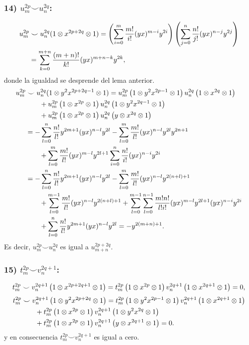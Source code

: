 \documentclass[fleqn,../tesis.tex]{subfiles}
\begin{document}
\subsubsection{14) $u_m^{2p} \smile u_n^{2q}$:}
\begin{align*}
	u_m^{2p} &\smile u_n^{2q}(1 \otimes x^{2p + 2q} \otimes 1) = \left(\sum_{i = 0}^{m}\frac{m!}{i!}(yx)^{m - i}y^{2i}\right)
			\left(\sum_{j = 0}^{n}\frac{n!}{j!}(yx)^{n - j}y^{2j}\right)\\
	&= \sum_{k = 0}^{m + n}\frac{(m + n)!}{k!}(yx)^{m + n - k}y^{2k},
\end{align*}
donde la igualdad se desprende del lema anterior.
\begin{align*}
	u_m^{2p} &\smile u_n^{2q}(1 \otimes y^2x^{2p + 2q - 1} \otimes 1) = 
		u_m^{2p}\left(1\otimes y^2x^{2p - 1}\otimes 1\right)u_n^{2q}\left(1\otimes x^{2q}\otimes 1\right)\\
	&\qquad + u_m^{2p}\left(1 \otimes x^{2p} \otimes 1\right)u_n^{2q}\left(1\otimes y^2x^{2q - 1}\otimes 1\right)\\
	&\qquad + u_m^{2p}\left(1 \otimes x^{2p} \otimes 1\right)u_n^{2q}\left(y\otimes x^{2q}\otimes 1\right)\\
	&= -\sum_{l = 0}^{n}\frac{n!}{l!}y^{2m + 1}(yx)^{n - l}y^{2l}
		-\sum_{l = 0}^{m}\frac{m!}{l!}(yx)^{n - l}y^{2l}y^{2n + 1}\\
	&\qquad + \sum_{l = 0}^{m}\frac{m!}{l!}(yx)^{m - l}y^{2l + 1}\sum_{i = 0}^{n}\frac{n!}{i!}(yx)^{n - i}y^{2i}\\
	&= -\sum_{l = 0}^{n}\frac{n!}{l!}y^{2m + 1}(yx)^{n - l}y^{2l}
		-\sum_{l = 0}^{m}\frac{m!}{l!}(yx)^{n - l}y^{2(n + l) + 1}\\
	&\qquad +\sum_{l = 0}^{m- 1}\frac{m!}{l!}(yx)^{n - l}y^{2(n + l) + 1}
		+ \sum_{l = 0}^{m - 1}\sum_{l = 0}^{n -1}\frac{m!n!}{l!i!}(yx)^{m - l}y^{2l + 1}(yx)^{n - i}y^{2i}\\
	&\qquad + \sum_{l = 0}^{n}\frac{n!}{l!}y^{2m + 1}(yx)^{n - l}y^{2l} = -y^{2(m + n) + 1}.
\end{align*}
Es decir, $u_m^{2p} \smile u_n^{2q}$ es igual a $u_{m + n}^{2p + 2q}$.
\subsubsection{15) $t_m^{2p} \smile v_n^{2q + 1}$:}
\begin{align*}
	t_m^{2p}\smile v_n^{2q + 1}\left(1\otimes x^{2p + 2q + 1} \otimes 1\right)
		= t_m^{2p}\left(1\otimes x^{2p}\otimes 1\right)v_n^{2q + 1}\left(1\otimes x^{2q + 1}\otimes 1\right) = 0,
\end{align*}
\begin{align*}
	t_m^{2p} & \smile v_n^{2q + 1}\left(1\otimes y^2x^{2p + 2q} \otimes 1\right)
		= t_m^{2p}\left(1\otimes y^2x^{2p - 1}\otimes 1\right)v_n^{2q + 1}\left(1\otimes x^{2q + 1}\otimes 1\right)\\
	&\qquad + t_m^{2p}\left(1 \otimes x^{2p} \otimes 1\right)v_n^{2q + 1}\left(1\otimes y^2x^{2q}\otimes 1\right)\\
	&\qquad + t_m^{2p}\left(1 \otimes x^{2p} \otimes 1\right)v_n^{2q + 1}\left(y\otimes x^{2q +1}\otimes 1\right) = 0.
\end{align*}
y en consecuencia $t_m^{2p}\smile v_n^{2q + 1}$ es igual a cero.
\end{document}

